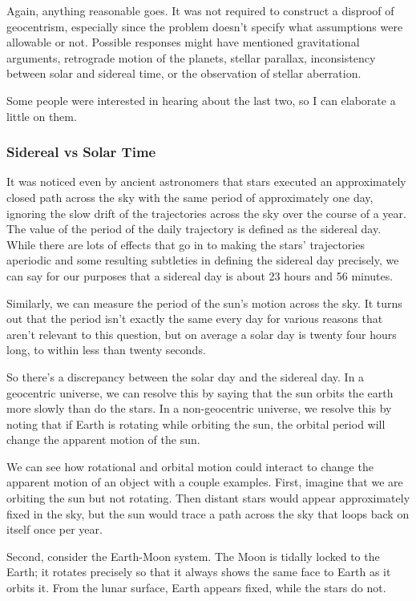 \documentclass[12pt]{article}
\begin{document}
Again, anything reasonable goes. It was not required to construct a disproof of geocentrism, especially since the problem doesn't specify what assumptions were allowable or not.  Possible responses might have mentioned gravitational arguments, retrograde motion of the planets, stellar parallax, inconsistency between solar and sidereal time, or the observation of stellar aberration.

Some people were interested in hearing about the last two, so I can elaborate a little on them.

\subsubsection*{Sidereal vs Solar Time}

It was noticed even by ancient astronomers that stars executed an approximately closed path across the sky with the same period of approximately one day, ignoring the slow drift of the trajectories across the sky over the course of a year. The value of the period of the daily trajectory is defined as the sidereal day. While there are lots of effects that go in to making the stars' trajectories aperiodic and some resulting subtleties in defining the sidereal day precisely, we can say for our purposes that a sidereal day is about 23 hours and 56 minutes.

Similarly, we can measure the period of the sun's motion across the sky. It turns out that the period isn't exactly the same every day for various reasons that aren't relevant to this question, but on average a solar day is twenty four hours long, to within less than twenty seconds.

So there's a discrepancy between the solar day and the sidereal day. In a geocentric universe, we can resolve this by saying that the sun orbits the earth more slowly than do the stars. In a non-geocentric universe, we resolve this by noting that if Earth is rotating while orbiting the sun, the orbital period will change the apparent motion of the sun.

We can see how rotational and orbital motion could interact to change the apparent motion of an object with a couple examples. First, imagine that we are orbiting the sun but not rotating. Then distant stars would appear approximately fixed in the sky, but the sun would trace a path across the sky that loops back on itself once per year. 

Second, consider the Earth-Moon system. The Moon is tidally locked to the Earth; it rotates precisely so that it always shows the same face to Earth as it orbits it. From the lunar surface, Earth appears fixed, while the stars do not.
\end{document}

